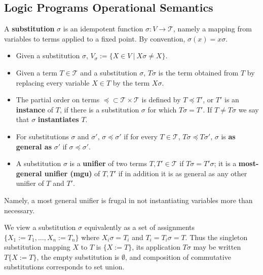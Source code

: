 \documentclass[runningheads,thm-restate]{llncs}
\newcommand{\temph}[1]{\textbf{#1}}  %
\newcommand{\calT}{\mathcal{T}}
\begin{document}
\subsection{Logic Programs Operational Semantics}

\begin{definition}\label{definition:substitution}
A \temph{substitution} $\sigma$ is an idempotent function $\sigma: V \xrightarrow{} \calT$, namely a mapping from variables to terms applied to a fixed point. By convention, $\sigma(x)=x\sigma$.
\begin{itemize}
    \item Given a substitution $\sigma$, $V_\sigma := \{ X \in V ~|~ X\sigma \ne X\}$.
    \item Given a term $T \in \calT$ and a substitution $\sigma$,  $T\sigma$ is the term obtained from $T$ by replacing every variable $X \in T$ by the term $X\sigma$.
    \item The partial order on terms $\preceq \subset \calT \times \calT$ is defined by $T \preceq T'$, or $T'$ is an \temph{instance} of $T$, if there is a substitution $\sigma$ for which $T\sigma = T'$.
    If $T \ne T\sigma$ we say that $\sigma$ \temph{instantiates} $T$. 
   
    \item For substitutions $\sigma$ and $\sigma'$, $\sigma \preceq \sigma'$ if for every $T \in \calT$, $T\sigma \preceq T\sigma'$, $\sigma$ is \temph{as general as}  $\sigma'$ if $\sigma \preceq \sigma'$.
    \item A substitution $\sigma$ is a \temph{unifier} of two terms $T, T' \in \calT$ if $T\sigma = T'\sigma$; it is a \temph{most-general unifier (mgu)} of $T, T'$ if in addition it is as general as any other unifier of $T$ and $T'$.
\end{itemize}
\end{definition}

Namely, a most general unifier is frugal in not instantiating variables more than necessary.

\begin{remark}
We  view a substitution $\sigma$ equivalently as a set of assignments $\{X_1:=T_1, \ldots, X_n:=T_n\}$ where $X_i\sigma = T_i$ and $T_i=T_i\sigma=T$. Thus the singleton substitution mapping $X$ to $T$ is $\{X:=T\}$, its application $T\sigma$ may be written $T\{X:=T\}$, the empty substitution is $\emptyset$, and composition of commutative substitutions corresponds to set union.
\end{remark}
\end{document}
